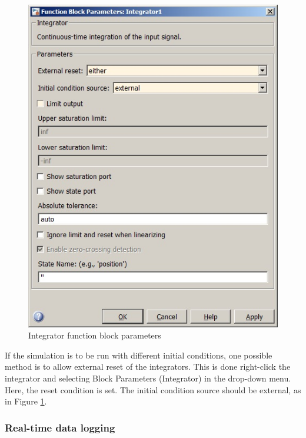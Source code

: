 \documentclass[a4paper,twoside,english]{report}
\begin{document}
\begin{figure}[!h]
\centering \includegraphics[scale=0.45]{fig/simulink_integrator} \caption{Integrator function block parameters}

\label{fig: simulink integrator function block parameters} 
\end{figure}

If the simulation is to be run with different initial conditions,
one possible method is to allow external reset of the integrators.
This is done right-click the integrator and selecting Block Parameters
(Integrator) in the drop-down menu. Here, the reset condition is set.
The initial condition source should be external, as in Figure \ref{fig: simulink integrator function block parameters}.

\subsubsection{\label{subsec:Real-time-data-logging}Real-time data logging}
\end{document}
